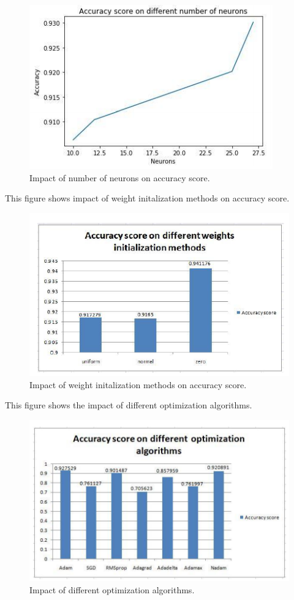 \begin{figure}[h]
  		\centering
    		\includegraphics[scale=0.85]{./Figures/neurons}
\caption{Impact of number of neurons on accuracy score.}
\label{fig:10}
 		\end{figure}
\clearpage

This figure shows impact of weight initalization methods on accuracy score.
\begin{figure}[h]
  		\centering
    		\includegraphics[scale=0.75]{./Figures/annmethods}
\caption{Impact of weight initalization methods on accuracy score.}
\label{fig:11}
 		\end{figure}


This figure shows the impact of different optimization algorithms.

\begin{figure}[h]
  		\centering
    		\includegraphics[scale=0.82]{./Figures/optalgos}
\caption{Impact of different optimization algorithms.}
\label{fig:12}
 		\end{figure}
\clearpage


